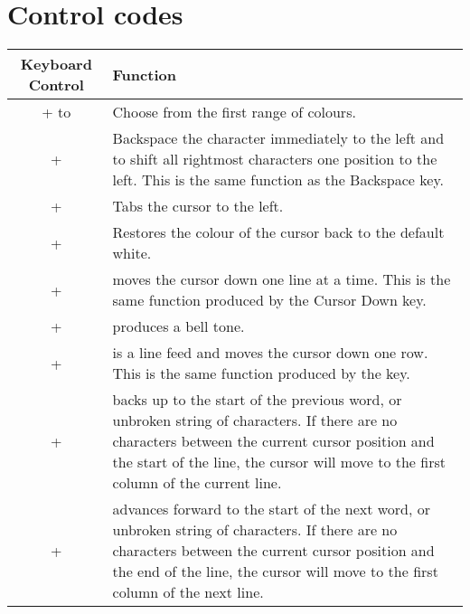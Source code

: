 \section{Control codes}
\label{appendix:controlcodes}

\begin{center}
\begin{longtable}{c|L{5.5cm}}
	\textbf{Keyboard Control} & \textbf{Function}\\
   \hline
	\endhead

 +  to  &
Choose from the first range of colours.\\

 +  &
Backspace the character immediately to the left and to shift all rightmost characters one position to the left. This is the same function as the Backspace key.\\

 +  &
Tabs the cursor to the left.\\

 +  &
Restores the colour of the cursor back to the default white.\\

 +  &
moves the cursor down one line at a time. This is the same function produced by the Cursor Down key.\\

 +  &
produces a bell tone.\\

 +  &
is a line feed and moves the cursor down one row. This is the same function produced by the \megakey{$\downarrow$} key.\\

 +  &
backs up to the start of the previous word, or unbroken string of characters. If there are no characters between the current cursor position and the start of the line, the cursor will move to the first column of the current line.\\

 +  &
advances forward to the start of the next word, or unbroken string of characters. If there are no characters between the current cursor position and the end of the line, the cursor will move to the first column of the next line.\\


\end{longtable}
\end{center}
